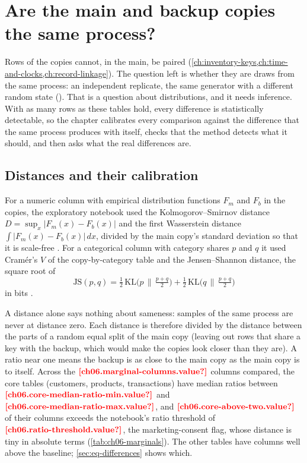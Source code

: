 \chapter{Are the main and backup copies the same process?}\label{ch:statistical-equivalence}

Rows of the copies cannot, in the main, be paired (\cref{ch:inventory-keys,ch:time-and-clocks,ch:record-linkage}). The
question left is whether they are draws from the same process: an independent replicate, the same generator with a
different random state (). That is a question about distributions, and it needs inference. With as many rows as
these tables hold, every difference is statistically detectable, so the chapter calibrates every comparison against
the difference that the same process produces with itself, checks that the method detects what it should, and then
asks what the real differences are.

\section{Distances and their calibration}\label{sec:eq-distances}

For a numeric column with empirical distribution functions $F_m$ and $F_b$ in the copies, the exploratory notebook
used the Kolmogorov--Smirnov distance $D = \sup_x \lvert F_m(x) - F_b(x) \rvert$ \autocite{smirnov1948} and the
first Wasserstein distance $\int \lvert F_m(x) - F_b(x) \rvert\,dx$, divided by the main copy's standard deviation so
that it is scale-free \autocite{ramdas2017}. For a categorical column with category shares $p$ and $q$ it used
Cram\'er's $V$ of the copy-by-category table \autocite{cramer1946} and the Jensen--Shannon distance, the square root of
\begin{equation}\label{eq:js}
  \mathrm{JS}(p, q) = \tfrac{1}{2}\,\mathrm{KL}\bigl(p \,\big\|\, \tfrac{p+q}{2}\bigr) + \tfrac{1}{2}\,\mathrm{KL}\bigl(q \,\big\|\, \tfrac{p+q}{2}\bigr)
\end{equation}
in bits \autocite{lin1991}.

A distance alone says nothing about sameness: samples of the same process are never at distance zero. Each
distance is therefore divided by the distance between the parts of a random equal split of the main copy (leaving out rows that share a
key with the backup, which would make the copies look closer than they are). A ratio near one means the backup is as
close to the main copy as the main copy is to itself. Across the $\est{ch06.marginal-columns}{value}$ columns compared,
the core tables (customers, products, transactions) have median ratios between $\est{ch06.core-median-ratio-min}{value}$
and $\est{ch06.core-median-ratio-max}{value}$, and $\est{ch06.core-above-two}{value}$ of their columns exceeds the notebook's ratio threshold of
$\est{ch06.ratio-threshold}{value}$, the marketing-consent flag, whose distance is tiny in absolute terms (\cref{tab:ch06-marginals}). The other
tables have columns well above the baseline; \cref{sec:eq-differences} shows which.

